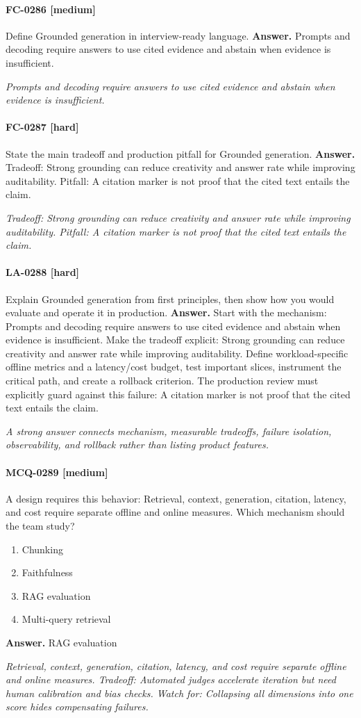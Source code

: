 \paragraph{FC-0286 [medium]} Define Grounded generation in interview-ready language.
\noindent\textbf{Answer.} Prompts and decoding require answers to use cited evidence and abstain when evidence is insufficient.
\par\textit{Prompts and decoding require answers to use cited evidence and abstain when evidence is insufficient.}
\paragraph{FC-0287 [hard]} State the main tradeoff and production pitfall for Grounded generation.
\noindent\textbf{Answer.} Tradeoff: Strong grounding can reduce creativity and answer rate while improving auditability. Pitfall: A citation marker is not proof that the cited text entails the claim.
\par\textit{Tradeoff: Strong grounding can reduce creativity and answer rate while improving auditability. Pitfall: A citation marker is not proof that the cited text entails the claim.}
\paragraph{LA-0288 [hard]} Explain Grounded generation from first principles, then show how you would evaluate and operate it in production.
\noindent\textbf{Answer.} Start with the mechanism: Prompts and decoding require answers to use cited evidence and abstain when evidence is insufficient. Make the tradeoff explicit: Strong grounding can reduce creativity and answer rate while improving auditability. Define workload-specific offline metrics and a latency/cost budget, test important slices, instrument the critical path, and create a rollback criterion. The production review must explicitly guard against this failure: A citation marker is not proof that the cited text entails the claim.
\par\textit{A strong answer connects mechanism, measurable tradeoffs, failure isolation, observability, and rollback rather than listing product features.}
\paragraph{MCQ-0289 [medium]} A design requires this behavior: Retrieval, context, generation, citation, latency, and cost require separate offline and online measures. Which mechanism should the team study?
\begin{enumerate}[label=\Alph*.]
\item Chunking
\item Faithfulness
\item RAG evaluation
\item Multi-query retrieval
\end{enumerate}
\noindent\textbf{Answer.} RAG evaluation
\par\textit{Retrieval, context, generation, citation, latency, and cost require separate offline and online measures. Tradeoff: Automated judges accelerate iteration but need human calibration and bias checks. Watch for: Collapsing all dimensions into one score hides compensating failures.}
